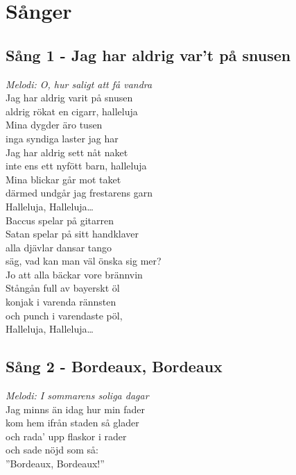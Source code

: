 \documentclass[a5paper]{article}
\begin{document}
	\newpage
		
	\section{Sånger}
	
	\subsection{Sång 1 - Jag har aldrig var't på snusen}
		\textit{Melodi: O, hur saligt att få vandra} \\
		
		\noindent 
		Jag har aldrig varit på snusen \\ 
		aldrig rökat en cigarr, halleluja \\ 
		Mina dygder äro tusen \\ 
		inga syndiga laster jag har \\ 
		Jag har aldrig sett nåt naket \\ 
		inte ens ett nyfött barn, halleluja \\ 
		Mina blickar går mot taket \\ 
		därmed undgår jag frestarens garn \\ 
		
		\noindent
		Halleluja, Halleluja… \\ 
		
		\noindent
		Baccus spelar på gitarren \\ 
		Satan spelar på sitt handklaver \\ 
		alla djävlar dansar tango \\ 
		säg, vad kan man väl önska sig mer? \\ 	
		
		\noindent
		Jo att alla bäckar vore brännvin \\
		Stångån full av bayerskt öl \\
		konjak i varenda rännsten \\
		och punch i varendaste pöl, \\
	
		\noindent
		Halleluja, Halleluja…
	\newpage
	\subsection{Sång 2 - Bordeaux, Bordeaux}
		\textit{Melodi: I sommarens soliga dagar} \\
		
		\noindent
		Jag minns än idag hur min fader \\
		kom hem ifrån staden så glader \\
		och rada’ upp flaskor i rader \\
		och sade nöjd som så: \\
		”Bordeaux, Bordeaux!” \\
		
\end{document}
